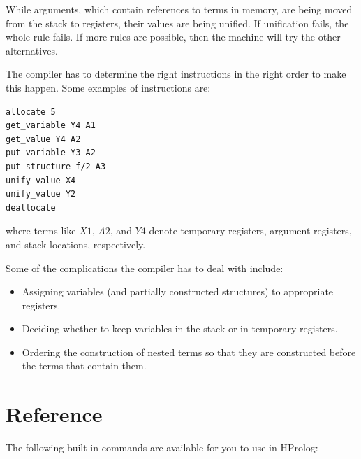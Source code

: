 \documentclass[11pt]{report}
\begin{document}
While arguments, which contain references to terms in memory, are being moved from the stack to registers, their values are being unified. If unification fails, the whole rule fails. If more rules are possible, then the machine will try the other alternatives.

The compiler has to determine the right instructions in the right order to make this happen. Some examples of instructions are:
\begin{verbatim}
allocate 5
get_variable Y4 A1
get_value Y4 A2
put_variable Y3 A2
put_structure f/2 A3
unify_value X4
unify_value Y2
deallocate
\end{verbatim}
where terms like $X1$, $A2$, and $Y4$ denote temporary registers, argument registers, and stack locations, respectively.

Some of the complications the compiler has to deal with include:
\begin{itemize}
\item Assigning variables (and partially constructed structures) to appropriate registers.
\item Deciding whether to keep variables in the stack or in temporary registers.
\item Ordering the construction of nested terms so that they are constructed before the terms that contain them.
\end{itemize}




%
%

\chapter{Reference}

The following built-in commands are available for you to use in HProlog:
\end{document}
